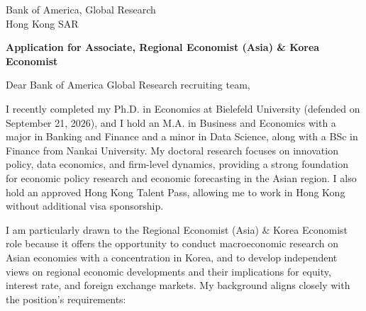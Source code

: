 \documentclass[11pt]{article}
\begin{document}
\vspace{0.1cm}

\vspace{0.1cm}

\noindent
Bank of America, Global Research \\
Hong Kong SAR

\vspace{0.12cm}

\noindent
\textbf{Application for Associate, Regional Economist (Asia) \& Korea Economist}

\vspace{0.1cm}

\noindent Dear Bank of America Global Research recruiting team,

I recently completed my Ph.D. in Economics at Bielefeld University (defended on September 21, 2026),
and I hold an M.A. in Business and Economics with a major in Banking and Finance and a minor in Data Science,
along with a BSc in Finance from Nankai University. My doctoral research focuses on innovation policy,
data economics, and firm-level dynamics, providing a strong foundation for economic policy research
and economic forecasting in the Asian region. I also hold an approved Hong Kong Talent Pass, allowing
me to work in Hong Kong without additional visa sponsorship.

I am particularly drawn to the Regional Economist (Asia) \& Korea Economist role because it offers the opportunity
to conduct macroeconomic research on Asian economies with a concentration in Korea, and to develop independent
views on regional economic developments and their implications for equity, interest rate, and foreign exchange
markets. My background aligns closely with the position's requirements:
\end{document}
